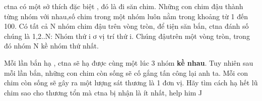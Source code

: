 ctna có một sở thích đặc biệt , đó là đi săn chim. Những con chim đậu thành từng nhóm với nhau,số chim trong một nhóm luôn nằm trong khoảng từ 1 đến 100. Có tất cả N nhóm chim đậu trên vòng tròn, để tiện săn bắn, ctna đánh số chúng là 1,2..N: Nhóm thứ i ơ vị trí thứ i. Chúng đậutrên một vòng tròn, trong đó nhóm N kề nhóm thứ nhất.

Mỗi lần bắn hạ , ctna sẽ hạ được cùng một lúc 3 nhóm \textbf{ kề nhau}. Tuy nhiên sau mỗi lần bắn, những con chim còn sống sẽ cố gắng tấn công lại anh ta. Mỗi con chim còn sống sẽ gây ra một lượng sát thương là 1 đơn vị. Hãy tìm cách hạ hết lũ chim sao cho thương tổn mà ctna bị nhận là ít nhất, help him ^^

\